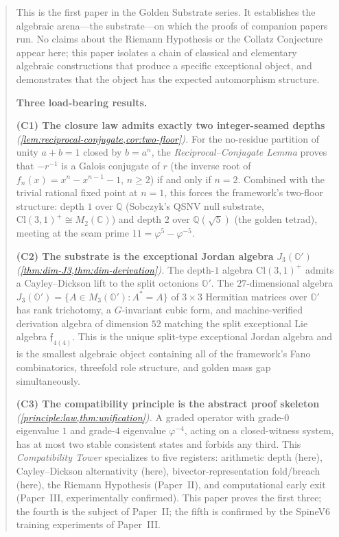 \documentclass[11pt,a4paper]{article}
\theoremstyle{plain}
\theoremstyle{definition}
\theoremstyle{remark}
\numberwithin{equation}{section}
\providecommand{\Cl}{\mathrm{Cl}}
\providecommand{\C}{\mathbb{C}}
\providecommand{\Q}{\mathbb{Q}}
\providecommand{\Os}{\mathbb{O}'}
\providecommand{\vp}{\varphi}
\providecommand{\fk}[1]{\mathfrak{#1}}
\begin{document}
\begin{abstract}
\noindent
This is the first paper in the Golden Substrate series.  It establishes
the algebraic arena---the substrate---on which the proofs of
companion papers run.  No claims about the Riemann Hypothesis or
the Collatz Conjecture appear here; this paper isolates a chain of
classical and elementary algebraic constructions that produce a
specific exceptional object, and demonstrates that the object has
the expected automorphism structure.

\medskip\noindent\textbf{Three load-bearing results.}

\medskip\noindent\textbf{(C1) The closure law admits exactly two
integer-seamed depths} \emph{(\cref{lem:reciprocal-conjugate,cor:two-floor}).}
For the no-residue partition of unity $a + b = 1$ closed by
$b = a^n$, the \emph{Reciprocal--Conjugate Lemma} proves that
$-r^{-1}$ is a Galois conjugate of $r$ (the inverse root of
$f_n(x) = x^n - x^{n-1} - 1$, $n \ge 2$) if and only if $n = 2$.
Combined with the trivial rational fixed point at $n=1$, this
forces the framework's two-floor structure: depth $1$ over $\Q$
(Sobczyk's QSNV null substrate, $\Cl(3,1)^+ \cong M_2(\C)$) and
depth $2$ over $\Q(\sqrt 5)$ (the golden tetrad), meeting at the
seam prime $11 = \vp^5 - \vp^{-5}$.

\medskip\noindent\textbf{(C2) The substrate is the exceptional
Jordan algebra} $J_3(\Os)$ \emph{(\cref{thm:dim-J3,thm:dim-derivation}).}
The depth-$1$ algebra $\Cl(3,1)^+$ admits a Cayley--Dickson lift to
the split octonions $\Os$.  The $27$-dimensional algebra
$J_3(\Os) = \{ A \in M_3(\Os) : A^* = A\}$ of $3{\times}3$
Hermitian matrices over $\Os$ has rank trichotomy, a
$G$-invariant cubic form, and machine-verified derivation algebra of
dimension $52$ matching the split exceptional Lie algebra
$\fk{f}_{4(4)}$.  This is the unique split-type exceptional Jordan
algebra and is the smallest algebraic object containing all of the
framework's Fano combinatorics, threefold role structure, and
golden mass gap simultaneously.

\medskip\noindent\textbf{(C3) The compatibility principle is the
abstract proof skeleton} \emph{(\cref{principle:law,thm:unification}).}
A graded operator with grade-$0$ eigenvalue $1$ and grade-$4$
eigenvalue $\vp^{-4}$, acting on a closed-witness system, has at
most two stable consistent states and forbids any third.  This
\emph{Compatibility Tower} specializes to five registers:
arithmetic depth (here), Cayley--Dickson alternativity (here),
bivector-representation fold/breach (here), the Riemann
Hypothesis (Paper~II), and computational early exit (Paper~III,
experimentally confirmed).  This paper proves the first three;
the fourth is the subject of Paper~II; the fifth is confirmed
by the SpineV6 training experiments of Paper~III.


\end{abstract}
\end{document}
